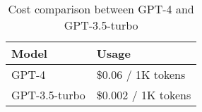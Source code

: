 \begin{table}[H]
    \centering
    \begin{tabular}{|l|l|}
        \hline \textbf{Model} & \textbf{Usage}      \\
        \hline GPT-4          & \$0.06 / 1K tokens  \\
        \hline GPT-3.5-turbo  & \$0.002 / 1K tokens \\
        \hline
    \end{tabular}
    \caption{Cost comparison between GPT-4 and GPT-3.5-turbo}
    \label{tab:cost_comparison}
\end{table}


\clearpage


\clearpage
